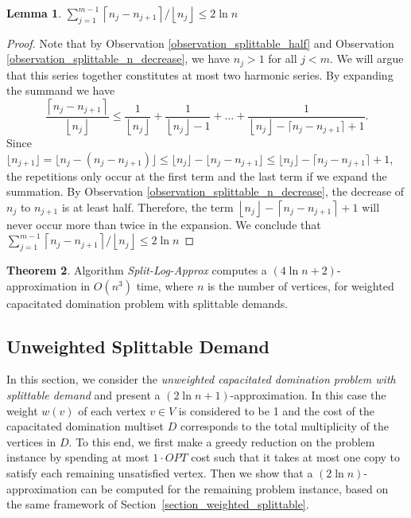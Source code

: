 \documentclass[a4paper,11pt]{article}
\theoremstyle{definition}
\newtheorem{theorem}{Theorem}
\newtheorem{lemma}[theorem]{Lemma}
\begin{document}
\begin{lemma}
$\sum_{j=1}^{m-1}\left\lceil n_j-n_{j+1}\right\rceil / \left\lfloor n_j\right\rfloor \le 2\ln n$
\end{lemma}

\begin{proof}
Note that by Observation \ref{observation_splittable_half} and Observation \ref{observation_splittable_n_decrease}, we have $n_j > 1$ for all $j < m$. We will argue that this series together constitutes at most two harmonic series. By expanding the summand we have 
$$\frac{\left\lceil n_j-n_{j+1}\right\rceil}{\left\lfloor n_j\right\rfloor} \le \frac{1}{\left\lfloor n_j\right\rfloor}+\frac{1}{\left\lfloor n_j\right\rfloor-1}+\ldots+\frac{1}{\left\lfloor n_j\right\rfloor - \lceil n_j-n_{j+1}\rceil+1}.$$
Since $\lfloor n_{j+1} \rfloor = \lfloor n_j-(n_j-n_{j+1}) \rfloor \le \lfloor n_j \rfloor-\lfloor n_j-n_{j+1} \rfloor \le \lfloor n_j \rfloor
-\lceil n_j-n_{j+1}\rceil + 1$, the repetitions only occur at the first term and the last term if we expand the summation. By Observation \ref{observation_splittable_n_decrease}, the decrease of $n_j$ to $n_{j+1}$ is at least half. Therefore, the term $\left\lfloor n_j\right\rfloor - \left\lceil n_j-n_{j+1}\right\rceil + 1$ will never occur more than twice in the expansion. We conclude that
$\sum_{j=1}^{m-1}\left\lceil n_j-n_{j+1}\right\rceil / \left\lfloor n_j\right\rfloor \le 2 \ln n$
\end{proof}

\begin{theorem}
Algorithm {\em Split-Log-Approx}
computes a $(4\ln n + 2)$-approximation in $O(n^3)$ time,
where $n$ is the number of vertices, for
weighted capacitated domination problem with splittable demands.
\end{theorem}



\subsection{Unweighted Splittable Demand} \label{section_unweighted_splittable}

In this section, we consider the {\em unweighted capacitated domination problem with splittable demand} and present a $(2\ln n+1)$-approximation. In this case the weight $w(v)$ of each vertex $v \in V$ is considered to be 1 and the cost of the capacitated domination multiset $D$ corresponds to the total multiplicity of the vertices in $D$.   To this end, we first make a greedy reduction on the problem instance by spending at most $1\cdot OPT$ cost such that it takes at most one copy to satisfy each remaining unsatisfied vertex. Then we show that a $(2\ln n)$-approximation can be computed for the remaining problem instance, based on the same framework of Section~\ref{section_weighted_splittable}.
\end{document}
